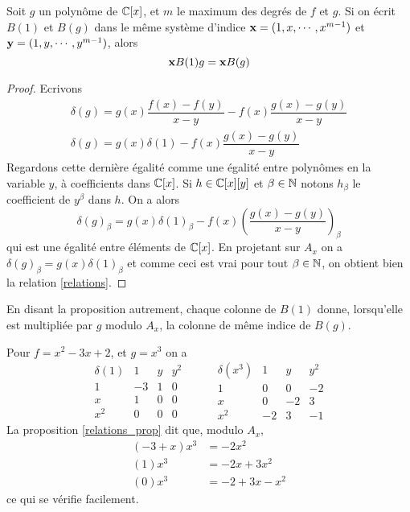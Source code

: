 \documentclass{standalone}
\begin{document}
  \begin{prop}
  \label{relations_prop}
  Soit $g$ un polynôme de $\mathbb{C}[x]$, et $m$ le maximum des degrés de $f$ et $g$. Si on écrit $B(1)$ et $B(g)$ dans le même système d'indice $\bold{x} = (1, x,\cdots, x^{m-1})$ et $\bold{y} = (1, y,\cdots, y^{m-1})$, alors
  \begin{equation}
  \label{relations}
  	\bold{x}B(1)g = \bold{x}B(g)
  \end{equation}
  \end{prop}
  \begin{proof}
  Ecrivons
  \begin{align} \nonumber
  	\delta(g) = g(x)\dfrac{f(x)-f(y)}{x-y} - f(x)\dfrac{g(x)-g(y)}{x-y} \\ \nonumber
  	\delta(g) = g(x)\delta(1) - f(x)\dfrac{g(x)-g(y)}{x-y}
  \end{align}
  Regardons cette dernière égalité comme une égalité entre polynômes en la variable $y$, à coefficients dans $\mathbb{C}[x]$. Si $h\in \mathbb{C}[x][y]$ et $\beta\in\mathbb{N}$ notons $h_\beta$ le coefficient de $y^\beta$ dans $h$. On a alors
  $$\delta(g)_\beta = g(x)\delta(1)_\beta - f(x)(\dfrac{g(x)-g(y)}{x-y})_\beta $$
  qui est une égalité entre éléments de $\mathbb{C}[x]$. En projetant sur $A_x$ on a
  $\delta(g)_\beta = g(x)\delta(1)_\beta$
  et comme ceci est vrai pour tout $\beta\in\mathbb{N}$, on obtient bien la relation \ref{relations}.
  \end{proof}
  \begin{rem}
  En disant la  proposition autrement, chaque colonne de $B(1)$ donne, lorsqu'elle est multipliée par $g$ modulo $A_x$, la colonne de même indice de $B(g)$.
  \end{rem}
  \begin{exmp}
  Pour $f = x^2 - 3x + 2$, et $g = x^3$ on a
  $$
  \begin{array}{c|ccc}
  \delta(1) & 1 & y & y^2\\
  \hline
  1 & -3 & 1 & 0\\
  x & 1 & 0 & 0\\
  x^2 & 0 & 0 & 0
  \end{array}
  \hspace{1cm}
  \begin{array}{c|ccc}
  \delta(x^3) & 1 & y & y^2\\
  \hline
  1 & 0 & 0 & -2\\
  x & 0 & -2 & 3\\
  x^2 & -2 & 3 & -1
  \end{array}
  $$
  La proposition \ref{relations_prop} dit que, modulo $A_x$,
  \begin{align} \nonumber
  	(-3 + x)x^3 &= -2x^2 \\ \nonumber
  	(1)x^3 &= -2x + 3x^2 \\ \nonumber
  	(0)x^3 &= -2 + 3x - x^2
  \end{align}
  ce qui se vérifie facilement.
  \end{exmp}
\end{document}
